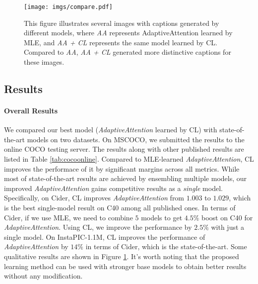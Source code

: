 \begin{figure}
\centering
\texttt{[image: imgs/compare.pdf]}
\caption{\small This figure illustrates several images with captions generated by different models,
where \emph{AA} represents AdaptiveAttention \cite{lu2016knowing} learned by MLE, 
and \emph{AA + CL} represents the same model learned by CL.
Compared to \emph{AA}, \emph{AA + CL} generated more distinctive captions for these images.}
\label{fig:compare}
\end{figure}

\subsection{Results}

\vspace{-5pt}
\paragraph{Overall Results} We compared our best model (\emph{AdaptiveAttention} \cite{lu2016knowing} learned by CL) with state-of-the-art models on two datasets.
On MSCOCO, we submitted the results to the online COCO testing server.
The results along with other published results are listed in Table \ref{tab:cocoonline}.
Compared to MLE-learned \emph{AdaptiveAttention}, 
CL improves the performace of it by significant margins across all metrics.
While most of state-of-the-art results are achieved by ensembling multiple models,
our improved \emph{AdaptiveAttention} gains competitive results as a \emph{single} model.
Specifically, on Cider, CL improves \emph{AdaptiveAttention} from $1.003$ to $1.029$,
which is the best single-model result on C40 among all published ones.
In terms of Cider,
if we use MLE,
we need to combine $5$ models to get $4.5\%$ boost on C40 for \emph{AdaptiveAttention}.
Using CL, we improve the performance by $2.5\%$ with just a single model.
On InstaPIC-1.1M, CL improves the performance of \emph{AdaptiveAttention} by $14\%$ in terms of Cider,
which is the state-of-the-art.
Some qualitative results are shown in Figure \ref{fig:compare}.
It's worth noting that the proposed learning method can be used with stronger base models to obtain better results
without any modification.


\vspace{-5pt}
